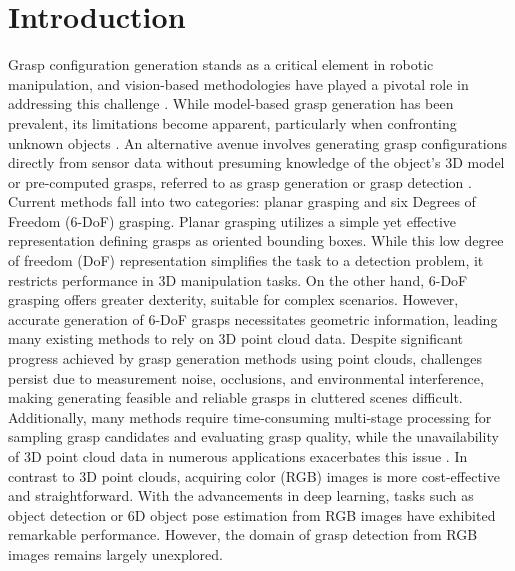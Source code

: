 \section{Introduction}
\label{sec:intro}

Grasp configuration generation stands as a critical element in robotic manipulation, and vision-based methodologies have played a pivotal role in addressing this challenge \cite{hoang2023grasp, hoang2022context, fang2020graspnet}. While model-based grasp generation has been prevalent, its limitations become apparent, particularly when confronting unknown objects \cite{du2021vision, hoang2020panoptic, hoang2020object, hoang2019object, hoang2016sub, hoang2022voting, vu2024occlusion, palleschi2020fully, chen2016innovative}. An alternative avenue involves generating grasp configurations directly from sensor data without presuming knowledge of the object's 3D model or pre-computed grasps, referred to as grasp generation or grasp detection \cite{fang2020graspnet, hoang2022context}. Current methods fall into two categories: planar grasping and six Degrees of Freedom (6-DoF) grasping. Planar grasping utilizes a simple yet effective representation defining grasps as oriented bounding boxes. While this low degree of freedom (DoF) representation simplifies the task to a detection problem, it restricts performance in 3D manipulation tasks. On the other hand, 6-DoF grasping offers greater dexterity, suitable for complex scenarios. However, accurate generation of 6-DoF grasps necessitates geometric information, leading many existing methods to rely on 3D point cloud data. Despite significant progress achieved by grasp generation methods using point clouds, challenges persist due to measurement noise, occlusions, and environmental interference, making generating feasible and reliable grasps in cluttered scenes difficult. Additionally, many methods require time-consuming multi-stage processing for sampling grasp candidates and evaluating grasp quality, while the unavailability of 3D point cloud data in numerous applications exacerbates this issue \cite{ten2017grasp, liang2019pointnetgpd, du2021vision}. In contrast to 3D point clouds, acquiring color (RGB) images is more cost-effective and straightforward. With the advancements in deep learning, tasks such as object detection or 6D object pose estimation from RGB images have exhibited remarkable performance. However, the domain of grasp detection from RGB images remains largely unexplored.

